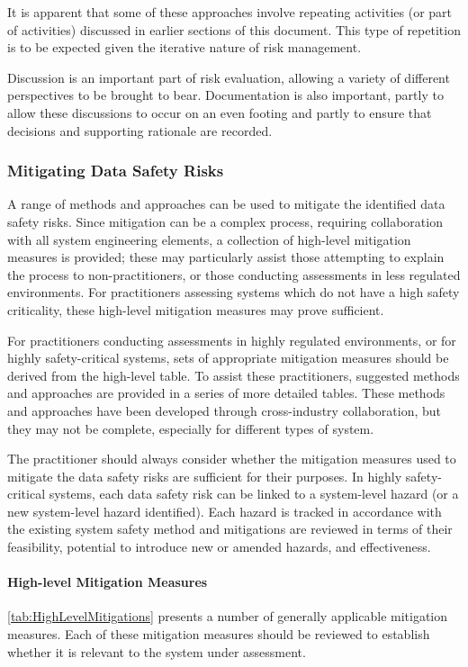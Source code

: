 It is apparent that some of these approaches involve repeating activities (or part of activities) discussed in earlier sections of this document. This type of repetition is to be expected given the iterative nature of risk management.

Discussion is an important part of risk evaluation, allowing a variety of different perspectives to be brought to bear. Documentation is also important, partly to allow these discussions to occur on an even footing and partly to ensure that decisions and supporting rationale are recorded.

\subsubsection{Mitigating Data Safety Risks}
A range of methods and approaches can be used to mitigate the identified data safety risks. Since mitigation can be a complex process, requiring collaboration with all system engineering elements, a collection of high-level mitigation measures is provided; these may particularly assist those attempting to explain the process to non-practitioners, or those conducting assessments in less regulated environments. For practitioners assessing systems which do not have a high safety criticality, these high-level mitigation measures may prove sufficient.

For practitioners conducting assessments in highly regulated environments, or for highly safety-critical systems, sets of appropriate mitigation measures should be derived from the high-level table. To assist these practitioners, suggested methods and approaches are provided in a series of more detailed tables. These methods and approaches have been developed through cross-industry collaboration, but they may not be complete, especially for different types of system. 

The practitioner should always consider whether the mitigation measures used to mitigate the data safety risks are sufficient for their purposes. In highly safety-critical systems, each data safety risk can be linked to a system-level hazard (or a new system-level hazard identified). Each hazard is tracked in accordance with the existing system safety method and mitigations are reviewed in terms of their feasibility, potential to introduce new or amended hazards, and effectiveness.

\paragraph{High-level Mitigation Measures}
\autoref{tab:HighLevelMitigations} presents a number of generally applicable mitigation measures.
Each of these mitigation measures should be reviewed to establish whether it is relevant to the system under assessment.

